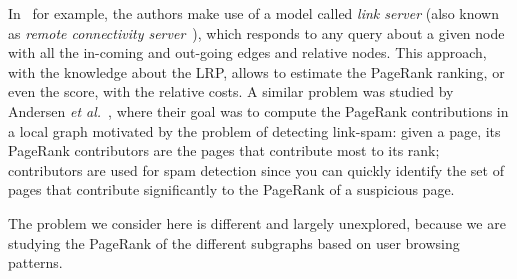 \documentclass{sig-alternate-2013}
\newcommand{\etal}{\emph{et al.}}
\begin{document}
In~\cite{Bar-Yossef2008,Bressan2011} for example, the authors make use of a model called {\it link server} (also known as {\it remote connectivity server}~\cite{Bharat1998}), which responds to any query about a given node with all the in-coming and out-going edges and relative nodes. This approach, with the knowledge about the LRP, allows to estimate the PageRank ranking, or even the score, with the relative costs.
A similar problem was studied by Andersen \etal~\cite{Andersen2007}, where their
goal was to compute the PageRank contributions in a local graph motivated by the
problem of detecting link-spam: given a page, its PageRank contributors are the
pages that contribute most to its rank; contributors are used for spam
detection since you can quickly identify the set of pages that contribute significantly to the PageRank of a suspicious page.

The problem we consider here is different and largely
unexplored, because we are studying the PageRank of the different subgraphs based
on user browsing patterns.


\end{document}
